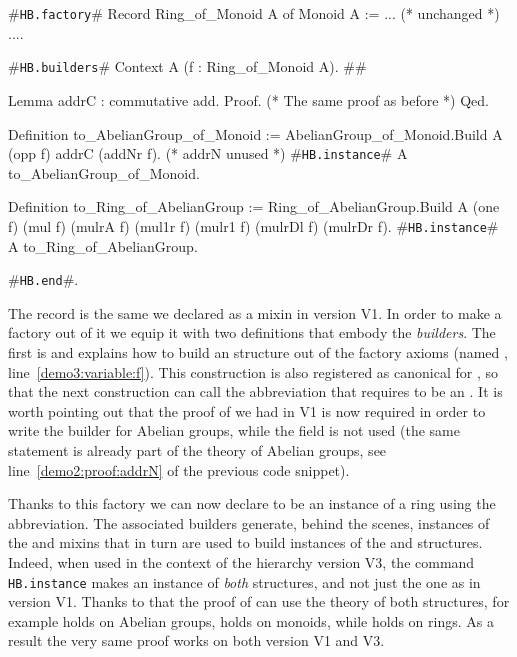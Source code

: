 \documentclass[a4paper,UKenglish,cleveref, autoref]{lipics-v2019}
\newcommand{\mixin}{mixin}
\newcommand{\mixins}{mixins}
\newcommand{\factory}{factory}
\newcommand{\phantterm}{abbreviation}
\newcommand{\builder}{builder}
\newcommand{\hbfactory}{{\tt\color{dkgreen}HB.factory}}
\newcommand{\hbinstance}{{\tt\color{dkgreen}HB.instance}}
\newcommand{\hbbuilders}{{\tt\color{dkgreen}HB.builders}}
\newcommand{\hbend}{{\tt\color{dkgreen}HB.end}}
\theoremstyle{implem}
\theoremstyle{implem}
\theoremstyle{command}
\theoremstyle{commands}
\begin{document}
\begin{coqcode}
#\hbfactory{}# Record Ring_of_Monoid A of Monoid A := { ... (* unchanged *) ...}.

#\hbbuilders{}# Context A (f : Ring_of_Monoid A).                          #\label{demo3:variable:f}#

  Lemma addrC : commutative add. Proof. (* The same proof as before *) Qed.

  Definition to_AbelianGroup_of_Monoid :=
    AbelianGroup_of_Monoid.Build A (opp f) addrC (addNr f). (* addrN unused *)
  #\hbinstance{}# A to_AbelianGroup_of_Monoid.

  Definition to_Ring_of_AbelianGroup :=  Ring_of_AbelianGroup.Build A
    (one f) (mul f) (mulrA f) (mul1r f) (mulr1 f) (mulrDl f) (mulrDr f).
  #\hbinstance{}# A to_Ring_of_AbelianGroup.

#\hbend{}#.
\end{coqcode}

The record  is the same we declared as a \mixin{}
in version V1. In order to make a \factory{} out of it we equip it with
two definitions that embody the \emph{\builder{}s}.
The first is  and
explains how to build an  structure out of the \factory{}
axioms (named , line~\ref{demo3:variable:f}).
This construction is also registered as canonical for ,
so that the next construction  can call
the  \phantterm{} that requires  to be
an .
It is worth pointing out that the proof of  we had in V1 is now
required in order to write the \builder{} for Abelian groups, while
the  field is not used (the same statement is already part of
the theory of Abelian groups, see line~\ref{demo2:proof:addrN} of the previous
code snippet).

Thanks to this \factory{} we can now declare  to be an instance
of a ring using the  \phantterm{}.
The associated \builder{}s generate, behind the scenes, instances of the
 and  \mixins{}
that in turn are used to build instances of the  and 
structures. Indeed, when used in the context of the hierarchy version V3,
the command \hbinstance{} 
makes  an instance of \emph{both} structures, and not just the 
one as in version V1.
Thanks to that the proof of  can use the theory of
both structures, for example  holds on Abelian groups,
 holds on monoids, while  holds on rings.
As a result the very same proof works on both
version V1 and V3.
\end{document}
